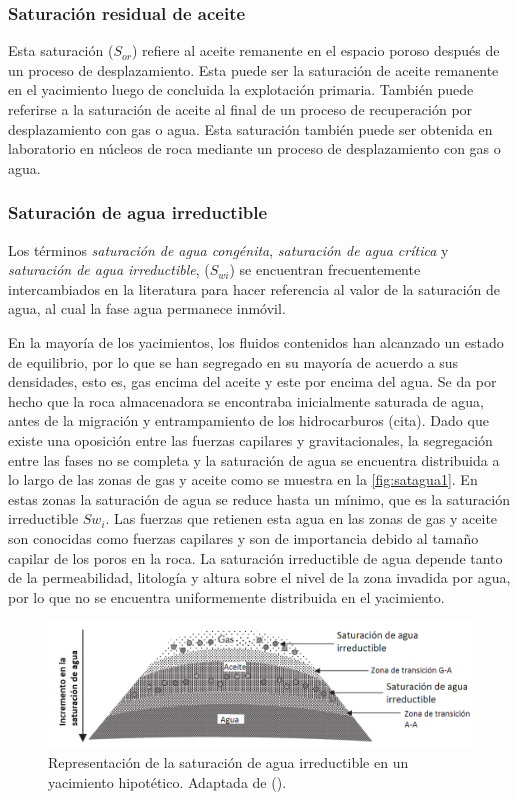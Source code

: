\subsubsection{Saturación residual de aceite}
Esta saturación ($S_{or}$) refiere al aceite remanente en el espacio poroso después de un proceso de desplazamiento. Esta puede ser la saturación de aceite remanente en el yacimiento luego de concluida la explotación primaria. También puede referirse a la saturación de aceite al final de un proceso de recuperación por desplazamiento con gas o agua. Esta saturación también puede ser obtenida en laboratorio en núcleos de roca mediante un proceso de desplazamiento con gas o agua.

\subsubsection{Saturación de agua irreductible}
Los términos \emph{saturación de agua congénita}, \emph{saturación de agua crítica} y \emph{saturación de agua irreductible}, ($S_{wi}$) se encuentran frecuentemente intercambiados en la literatura para hacer referencia al valor de la saturación de agua, al cual la fase agua permanece inmóvil. 

En la mayoría de los yacimientos, los fluidos contenidos han alcanzado un estado de equilibrio, por lo que se han segregado en su mayoría de acuerdo a sus densidades, esto es, gas encima del aceite y este por encima del agua. Se da por hecho que la roca almacenadora se encontraba inicialmente saturada de agua, antes de la migración y entrampamiento de los hidrocarburos (cita). Dado que existe una oposición entre las fuerzas capilares y gravitacionales, la segregación entre las fases no se completa y la saturación de agua se encuentra distribuida a lo largo de las zonas de gas y aceite como se muestra en la \autoref{fig:satagua1}. En estas zonas la saturación de agua se reduce hasta un mínimo, que es la saturación irreductible $Sw_{i}$.
Las fuerzas que retienen esta agua en las zonas de gas y aceite son conocidas como fuerzas capilares y son de importancia debido al tamaño capilar de los poros en la roca. La saturación irreductible de agua depende tanto de la permeabilidad, litología y altura sobre el nivel de la zona invadida por agua, por lo que no se encuentra uniformemente distribuida en el yacimiento.

\begin{figure}
    \centering
    \includegraphics[width=\textwidth]{Graphics/satagua1.png}
    \caption[Saturación de agua irredcutible]{Representación de la saturación de agua irreductible en un yacimiento hipotético. Adaptada de (\cite{Dandekar}). }
    \label{fig:satagua1}
\end{figure}

